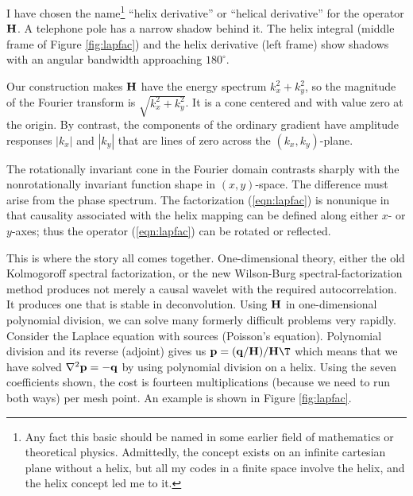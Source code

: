 \par
I have chosen the name\footnote{
        Any fact this basic should be named in some earlier field
        of mathematics or theoretical physics.
        Admittedly, the concept exists on an infinite cartesian plane
        without a helix, but all my codes in a finite space involve the helix,
        and the helix concept led me to it.
        }
``helix derivative''
or ``helical derivative'' for the operator $\bold H$.
A telephone pole has a narrow shadow behind it.
The helix integral (middle frame of Figure \ref{fig:lapfac})
and the helix derivative (left frame)
show shadows with an angular bandwidth approaching $180^\circ$.

\par
Our construction makes $\bold H$ have the energy spectrum $k_x^2+k_y^2$,
so the magnitude of the Fourier transform is $\sqrt{k_x^2+k_y^2}$.
It is a cone
centered and with value zero at the origin.
By contrast, the components of the ordinary gradient
have amplitude responses $|k_x|$ and $|k_y|$
that are lines of zero across the
$(k_x,k_y)$-plane.

\par
The rotationally invariant cone in the Fourier domain
contrasts sharply with the nonrotationally invariant
function shape in $(x,y)$-space.
The difference must arise from the phase spectrum.
The factorization (\ref{eqn:lapfac})
is nonunique in that causality
associated with the helix mapping
can be defined along either $x$- or $y$-axes;
thus the operator 
(\ref{eqn:lapfac})
can be rotated or reflected.


\par
This is where the story all comes together.
One-dimensional theory, either the old
Kolmogoroff spectral factorization,
or the new
Wilson-Burg spectral-factorization method
produces not merely a causal wavelet
with the required autocorrelation.
It produces one that is stable in deconvolution.
Using $\bold H$ in one-dimensional polynomial division,
we can solve many formerly difficult problems very rapidly.
Consider the Laplace equation with sources (Poisson's equation).
Polynomial division and its reverse (adjoint) gives us
$\bold p =(\bold q/\bold H)/\bold H\T$
which means that we have solved
$\nabla^2 \bold p = -\bold q$
by using polynomial division on a helix.
Using the seven coefficients shown,
the cost is fourteen multiplications
(because we need to run both ways) per mesh point.
An example is shown in Figure \ref{fig:lapfac}.

